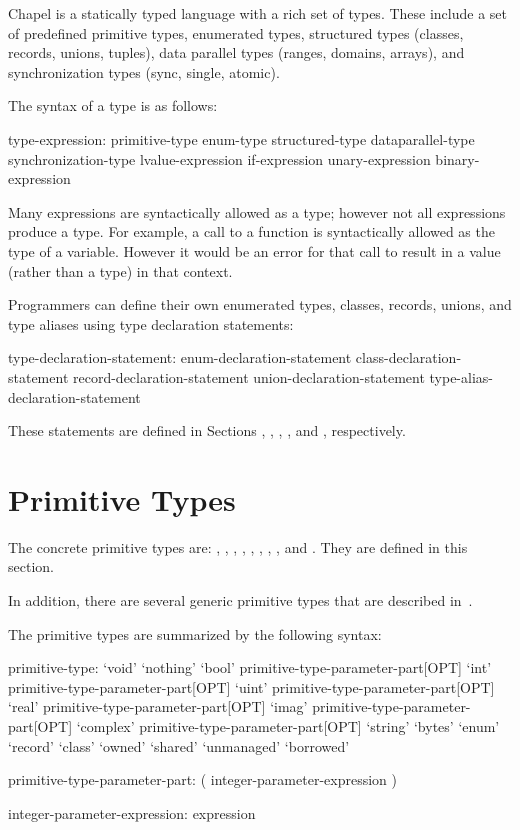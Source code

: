 \label{Types}

Chapel is a statically typed language with a rich set of types.  These
include a set of predefined primitive types, enumerated types,
structured types (classes, records, unions, tuples),
data parallel types (ranges, domains, arrays), and synchronization
types (sync, single, atomic).

The syntax of a type is as follows:

\begin{syntax}
type-expression:
  primitive-type
  enum-type
  structured-type
  dataparallel-type
  synchronization-type
  lvalue-expression
  if-expression
  unary-expression
  binary-expression
\end{syntax}

Many expressions are syntactically allowed as a type; however not
all expressions produce a type. For example, a call to a function is
syntactically allowed as the type of a variable. However it would be an
error for that call to result in a value (rather than a type) in that
context.

Programmers can define their own enumerated types, classes, records,
unions, and type aliases using type declaration statements:

\begin{syntax}
type-declaration-statement:
  enum-declaration-statement
  class-declaration-statement
  record-declaration-statement
  union-declaration-statement
  type-alias-declaration-statement
\end{syntax}

These statements are defined in Sections ,
, ,
, and , respectively.

\section{Primitive Types}
\label{Primitive_Types}

The concrete primitive types are: , , ,
, , , , ,
 and .  They are defined in this section.

In addition, there are several generic primitive types that are described
in~.

The primitive types are summarized by the following syntax:
\begin{syntax}
primitive-type:
  `void'
  `nothing'
  `bool' primitive-type-parameter-part[OPT]
  `int' primitive-type-parameter-part[OPT]
  `uint' primitive-type-parameter-part[OPT]
  `real' primitive-type-parameter-part[OPT]
  `imag' primitive-type-parameter-part[OPT]
  `complex' primitive-type-parameter-part[OPT]
  `string'
  `bytes'
  `enum'
  `record'
  `class'
  `owned'
  `shared'
  `unmanaged'
  `borrowed'

primitive-type-parameter-part:
  ( integer-parameter-expression )

integer-parameter-expression:
  expression
\end{syntax}

